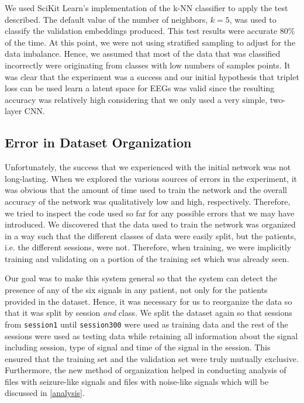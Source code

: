 We used SciKit Learn's implementation of the k-NN classifier to apply the test described. The default value of the number of neighbors, $k=5$, was used to classify the validation embeddings produced. This test results were accurate 80\% of the time. At this point, we were not using stratified sampling to adjust for the data imbalance. Hence, we assumed that most of the data that was classified incorrectly were originating from classes with low numbers of samples points. It was clear that the experiment was a success and our initial hypothesis that triplet loss can be used learn a latent space for EEGs was valid since the resulting accuracy was relatively high considering that we only used a very simple, two-layer CNN.

\subsection{Error in Dataset Organization}

Unfortunately, the success that we experienced with the initial network was not long-lasting. When we explored the various sources of errors in the experiment, it was obvious that the amount of time used to train the network and the overall accuracy of the network was qualitatively low and high, respectively. Therefore, we tried to inspect the code used so far for any possible errors that we may have introduced. We discovered that the data used to train the network was organized in a way such that the different classes of data were easily split, but the patients, i.e. the different sessions, were not. Therefore, when training, we were implicitly training and validating on a portion of the training set which was already seen. 

Our goal was to make this system general so that the system can detect the presence of any of the six signals in any patient, not only for the patients provided in the dataset. Hence, it was necessary for us to reorganize the data so that it was split by session \textit{and} class. We split the dataset again so that sessions from \verb+session1+ until \verb+session300+ were used as training data and the rest of the sessions were used as testing data while retaining all information about the signal including session, type of signal and time of the signal in the session. This ensured that the training set and the validation set were truly mutually exclusive. Furthermore, the new method of organization helped in conducting analysis of files with seizure-like signals and files with noise-like signals which will be discussed in \cref{analysis}.

